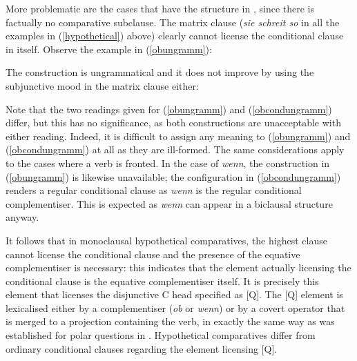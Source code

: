 More problematic are the cases that have the structure in , since there is factually no comparative subclause. The matrix clause (\textit{sie schreit so} in all the examples in (\ref{hypothetical}) above) clearly cannot license the conditional clause in itself. Observe the example in (\ref{obungramm}):

\z

The construction is ungrammatical and it does not improve by using the subjunctive mood in the matrix clause either:

\z

Note that the two readings given for (\ref{obungramm}) and (\ref{obcondungramm}) differ, but this has no significance, as both constructions are unacceptable with either reading. Indeed, it is difficult to assign any meaning to (\ref{obungramm}) and (\ref{obcondungramm}) at all as they are ill-formed. The same considerations apply to the cases where a verb is fronted. In the case of \textit{wenn}, the construction in (\ref{obungramm}) is likewise unavailable; the configuration in (\ref{obcondungramm}) renders a regular conditional clause as \textit{wenn} is the regular conditional complementiser. This is expected as \textit{wenn} can appear in a biclausal structure anyway.

It follows that in monoclausal hypothetical comparatives, the highest clause cannot license the conditional clause and the presence of the equative complementiser is necessary: this indicates that the element actually licensing the conditional clause is the equative complementiser itself. It is precisely this element that licenses the disjunctive C head specified as [Q]. The [Q] element is lexicalised either by a complementiser (\textit{ob} or \textit{wenn}) or by a covert operator that is merged to a projection containing the verb, in exactly the same way as was established for polar questions in . Hypothetical comparatives differ from ordinary conditional clauses regarding the element licensing [Q].

